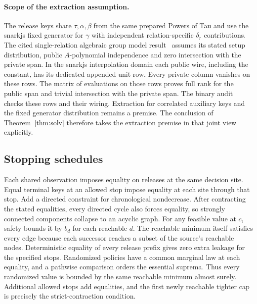 \paragraph{Scope of the extraction assumption.}
The release keys share $\tau,\alpha,\beta$ from the same prepared Powers of Tau and use the snarkjs fixed generator for $\gamma$ with independent relation-specific $\delta_r$ contributions. The cited single-relation algebraic group model result~\cite{baghery2021} assumes its stated setup distribution, public $A$-polynomial independence and zero intersection with the private span. In the snarkjs interpolation domain each public wire, including the constant, has its dedicated appended unit row. Every private column vanishes on these rows. The matrix of evaluations on those rows proves full rank for the public span and trivial intersection with the private span. The binary audit checks these rows and their wiring. Extraction for correlated auxiliary keys and the fixed generator distribution remains a premise. The conclusion of Theorem~\ref{thm:solv} therefore takes the extraction premise in that joint view explicitly.

\subsection{Stopping schedules}
Each shared observation imposes equality on releases at the same decision site. Equal terminal keys at an allowed stop impose equality at each site through that stop. Add a directed constraint for chronological nondecrease. After contracting the stated equalities, every directed cycle also forces equality, so strongly connected components collapse to an acyclic graph. For any feasible value at $c$, safety bounds it by $b_d$ for each reachable $d$. The reachable minimum itself satisfies every edge because each successor reaches a subset of the source's reachable nodes. Deterministic equality of every release prefix gives zero extra leakage for the specified stops. Randomized policies have a common marginal law at each equality, and a pathwise comparison orders the essential suprema. Thus every randomized value is bounded by the same reachable minimum almost surely. Additional allowed stops add equalities, and the first newly reachable tighter cap is precisely the strict-contraction condition.

